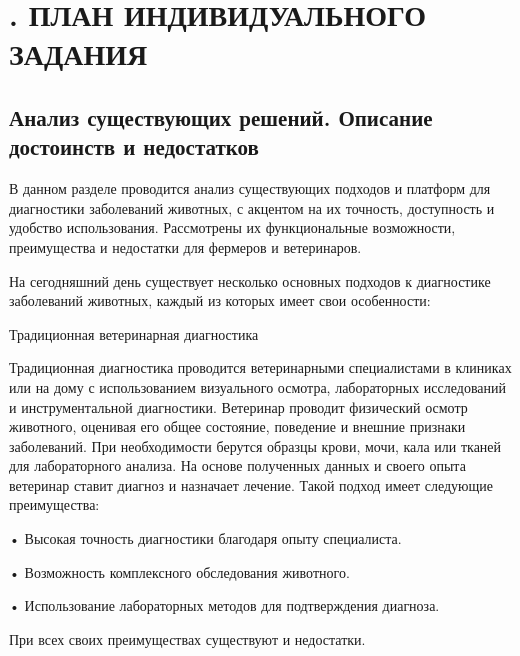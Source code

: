 \sectionbreak \section*{
  \gostTitleFont
  . ПЛАН ИНДИВИДУАЛЬНОГО ЗАДАНИЯ
}

\titlespace

\subsection*{
  \gostTitleFont
   Анализ существующих решений. Описание достоинств и недостатков
}

{\gostFont

  \par \redline В данном разделе проводится анализ существующих подходов и платформ для диагностики заболеваний животных, с акцентом на их точность, доступность и удобство использования. Рассмотрены их функциональные возможности, преимущества и недостатки для фермеров и ветеринаров.

  \par \redline На сегодняшний день существует несколько основных подходов к диагностике заболеваний животных, каждый из которых имеет свои особенности:
  
  \par \redline Традиционная ветеринарная диагностика

  \par \redline Традиционная диагностика проводится ветеринарными специалистами в клиниках или на дому с использованием визуального осмотра, лабораторных исследований и инструментальной диагностики. Ветеринар проводит физический осмотр животного, оценивая его общее состояние, поведение и внешние признаки заболеваний. При необходимости берутся образцы крови, мочи, кала или тканей для лабораторного анализа. На основе полученных данных и своего опыта ветеринар ставит диагноз и назначает лечение. Такой подход имеет следующие преимущества:
  
  \par \redline • Высокая точность диагностики благодаря опыту специалиста.
  \par \redline • Возможность комплексного обследования животного.
  \par \redline • Использование лабораторных методов для подтверждения диагноза.

  \par \redline При всех своих преимуществах существуют и недостатки.

}
